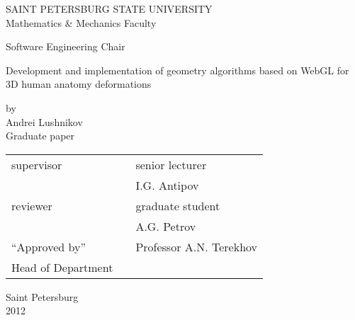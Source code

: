 \thispagestyle{empty}
\begin{center}
SAINT PETERSBURG STATE UNIVERSITY\\
Mathematics \& Mechanics Faculty\\
\end{center}
\begin{center}
Software Engineering Chair\\
\end{center}
\vspace{2cm}
\begin{center}
    \Large{Development and implementation of geometry algorithms based on WebGL
    for 3D human anatomy deformations} \\
\end{center}
\vspace{1cm}
\begin{center}
    \normalsize{by} \\
    \large{Andrei Lushnikov}\\
    \large{Graduate paper}
\end{center}
\vspace{3cm}
\noindent
\begin{center}
    \small
    \begin{tabular}{lcl}
        supervisor & \dotuline{\phantom{кошерная подпись}} & senior lecturer\\
        & & I.G. Antipov \\
        reviewer & \dotuline{\phantom{кошерная подпись}} & graduate student \\
        & & A.G. Petrov \\
        ``Approved by'' & \dotuline{\phantom{кошерная подпись}} & Professor A.N.
        Terekhov\\
        Head of Department & & \\
    \end{tabular}
\end{center}
\vspace{\fill}
\begin{center}
    \small
    Saint Petersburg\\2012
\end{center}
\pagebreak

